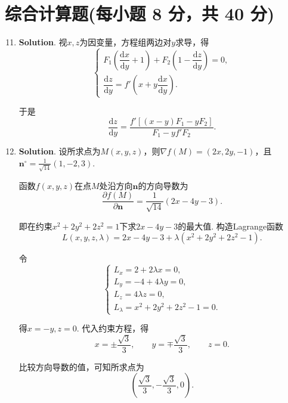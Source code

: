 \documentclass[../Main.tex]{subfiles}
\begin{document}
\section{综合计算题(每小题 8 分，共 40 分)}
\begin{enumerate}
    \setcounter{enumi}{10}
    \item \textbf{Solution}. 视$x,z$为因变量，方程组两边对$y$求导，得
          \[
              \begin{cases}
                  F_{1}\left(\dfrac{\mathrm{d}x}{\mathrm{d}y}+1\right)
                  +F_{2}\left(1-\dfrac{\mathrm{d}z}{\mathrm{d}y}\right)=0, \\[8pt]
                  \dfrac{\mathrm{d}z}{\mathrm{d}y}=f'\left(x+y\dfrac{\mathrm{d}x}{\mathrm{d}y}\right).
              \end{cases}
          \]

          于是
          \[
              \frac{\mathrm{d}z}{\mathrm{d}y}
              =\frac{f'\left[(x-y)F_{1}-yF_{2}\right]}{F_{1}-yf'F_{2}}.
          \]

    \item \textbf{Solution}. 设所求点为$M(x,y,z)$，则$\nabla f(M)=(2x,2y,-1)$，且
          $\boldsymbol{n}^{\circ}=\frac{1}{\sqrt{14}}(1,-2,3)$.

          函数$f(x,y,z)$在点$M$处沿方向$\boldsymbol{n}$的方向导数为
          \[
              \frac{\partial f(M)}{\partial \boldsymbol{n}}
              =\frac{1}{\sqrt{14}}(2x-4y-3).
          \]

          即在约束$x^{2}+2y^{2}+2z^{2}=1$下求$2x-4y-3$的最大值. 构造Lagrange函数
          \[
              L(x,y,z,\lambda)=2x-4y-3+\lambda(x^{2}+2y^{2}+2z^{2}-1).
          \]

          令
          \[
              \begin{cases}
                  L_{x}=2+2\lambda x=0,  \\
                  L_{y}=-4+4\lambda y=0, \\
                  L_{z}=4\lambda z=0,    \\
                  L_{\lambda}=x^{2}+2y^{2}+2z^{2}-1=0.
              \end{cases}
          \]

          得$x=-y,z=0$. 代入约束方程，得
          \[
              x=\pm\frac{\sqrt3}{3},\qquad y=\mp\frac{\sqrt3}{3},\qquad z=0.
          \]

          比较方向导数的值，可知所求点为
          \[
              \left(\frac{\sqrt3}{3},-\frac{\sqrt3}{3},0\right).
          \]


\end{enumerate}
\end{document}
